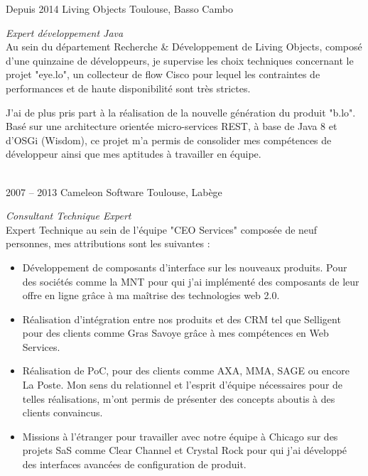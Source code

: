 \documentclass{friggeri-cv} 	%
\begin{document}
\begin{entrylist}
\entry
{Depuis 2014}
{Living Objects}
{Toulouse, Basso Cambo}
{\vspace{0.2cm}\emph{Expert développement Java} \\
Au sein du département Recherche \& Développement de Living Objects, composé d'une quinzaine de développeurs, je supervise les choix techniques concernant le projet "eye.lo", un collecteur de flow Cisco pour lequel les contraintes de performances et de haute disponibilité sont très strictes.

J'ai de plus pris part à la réalisation de la nouvelle génération du produit "b.lo". Basé sur une architecture orientée micro-services REST, à base de Java 8 et d'OSGi (Wisdom), ce projet m'a permis de consolider mes compétences de développeur ainsi que mes aptitudes à travailler en équipe.
}\\

\entry
{2007 -- 2013}
{Cameleon Software}
{Toulouse, Labège}
{\vspace{0.2cm}\emph{Consultant Technique Expert} \\
Expert Technique au sein de l'équipe "CEO Services" composée de neuf personnes, mes attributions sont les suivantes :
\begin{itemize}
\item Développement de composants d’interface sur les nouveaux produits. Pour des sociétés
comme la MNT pour qui j’ai implémenté des composants de leur offre en ligne grâce à ma
maîtrise des technologies web 2.0.
\item Réalisation d’intégration entre nos produits et des CRM tel que Selligent pour des clients
comme Gras Savoye grâce à mes compétences en Web Services.
\item Réalisation de PoC, pour des clients comme AXA, MMA, SAGE ou encore La Poste. Mon sens
du relationnel et l'esprit d'équipe nécessaires pour de telles réalisations, m'ont permis de
présenter des concepts aboutis à des clients convaincus.
\item Missions à l’étranger pour travailler avec notre équipe à Chicago sur des projets SaS comme
Clear Channel et Crystal Rock pour qui j'ai développé des interfaces avancées de
configuration de produit.
\end{itemize}
}\\


\end{entrylist}
\end{document}
